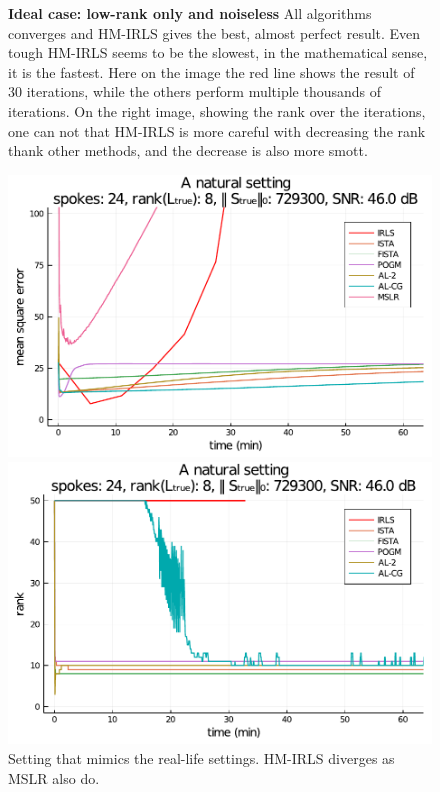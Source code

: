 \begin{figure}
\begin{minipage}{0.48\linewidth}
    \end{minipage}
    \caption{\textbf{Ideal case: low-rank only and noiseless} All algorithms converges and HM-IRLS gives the best, almost perfect result. Even tough HM-IRLS seems to be the slowest, in the mathematical sense, it is the fastest. Here on the image the red line shows the result of 30 iterations, while the others perform multiple thousands of iterations. On the right image, showing the rank over the iterations, one can not that HM-IRLS is more careful with decreasing the rank thank other methods, and the decrease is also more smott.}
    \label{fig:ideal}
\end{figure}

\begin{figure}
    \centering
    \begin{minipage}[t]{0.48\linewidth}
        \centering
        \includegraphics[width=\linewidth]{images/orig_MSE.pdf}
    \end{minipage}
    \begin{minipage}[t]{0.48\linewidth}
        \centering
        \includegraphics[width=\linewidth]{images/orig_rank.pdf}
    \end{minipage}
    \caption{{Setting that mimics the real-life settings.} HM-IRLS diverges as MSLR also do.}
    \label{fig:orig}
\end{figure}

